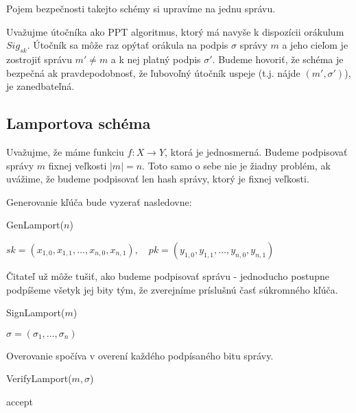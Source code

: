 Pojem bezpečnosti takejto schémy si upravíme na jednu správu.
\begin{definicia}[Bezpečnosť]
    Uvažujme útočníka ako PPT algoritmus, ktorý má navyše k dispozícii
    orákulum $Sig_{sk}$. Útočník sa môže raz opýtať orákula na podpis
    $\sigma$ správy $m$ a jeho cieľom je zostrojiť
    správu $m' \ne m$ a k nej platný podpis $\sigma'$.
    Budeme hovoriť, že schéma je bezpečná ak pravdepodobnosť,
    že ľubovoľný útočník uspeje (t.j. nájde $(m',\sigma')$), je zanedbateľná.
\end{definicia}

\subsection{Lamportova schéma}

Uvažujme, že máme funkciu $f: X \rightarrow Y$, ktorá je jednosmerná.
Budeme podpisovať správy $m$ fixnej veľkosti $|m|=n$. Toto samo o sebe nie
je žiadny problém, ak uvážime, že budeme podpisovať len hash správy, ktorý je
fixnej veľkosti.

Generovanie kľúča bude vyzerať nasledovne:
\begin{procedure}
    \caption{GenLamport($n$)}
    \Return $sk=(x_{1,0},x_{1,1},\ldots,x_{n,0},x_{n,1}),\quad
             pk=(y_{1,0},y_{1,1},\ldots,y_{n,0},y_{n,1})$\;
\end{procedure}

Čitateľ už môže tušiť, ako budeme podpisovať správu - jednoducho postupne
podpíšeme všetyk jej bity tým, že zverejníme príslušnú časť súkromného
kľúča.

\begin{procedure}
    \caption{SignLamport($m$)}
    \Return $\sigma = (\sigma_1, \ldots, \sigma_n)$
\end{procedure}

Overovanie spočíva v overení každého podpísaného bitu správy.

\begin{procedure}
    \caption{VerifyLamport($m, \sigma$)}
    \Return accept\;
\end{procedure}

